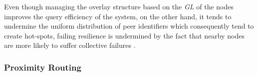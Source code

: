 Even though managing the overlay structure based on the \emph{GL} of the
nodes improves the query efficiency of the system, on the other hand, it tends
to undermine the uniform distribution of peer identifiers which consequently
tend to create hot-spots, failing resilience is undermined by the fact
that nearby nodes are more likely to suffer collective failures \cite{HY2007}.



%
%
%

\subsubsection{Proximity Routing}

